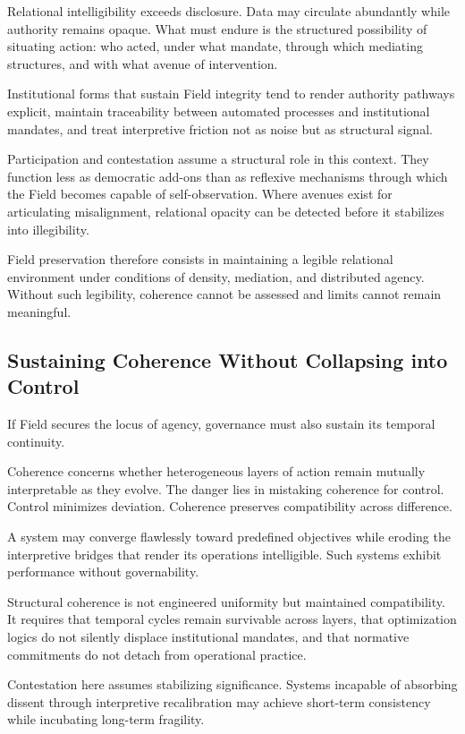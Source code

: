 \documentclass[12pt]{article}
\begin{document}
Relational intelligibility exceeds disclosure. Data may circulate abundantly while authority remains opaque. What must endure is the structured possibility of situating action: who acted, under what mandate, through which mediating structures, and with what avenue of intervention.

Institutional forms that sustain Field integrity tend to render authority pathways explicit, maintain traceability between automated processes and institutional mandates, and treat interpretive friction not as noise but as structural signal.

Participation and contestation assume a structural role in this context. They function less as democratic add-ons than as reflexive mechanisms through which the Field becomes capable of self-observation. Where avenues exist for articulating misalignment, relational opacity can be detected before it stabilizes into illegibility.

Field preservation therefore consists in maintaining a legible relational environment under conditions of density, mediation, and distributed agency. Without such legibility, coherence cannot be assessed and limits cannot remain meaningful.

\subsection{Sustaining Coherence Without Collapsing into Control}


If Field secures the locus of agency, governance must also sustain its temporal continuity.

Coherence concerns whether heterogeneous layers of action remain mutually interpretable as they evolve. The danger lies in mistaking coherence for control. Control minimizes deviation. Coherence preserves compatibility across difference.

A system may converge flawlessly toward predefined objectives while eroding the interpretive bridges that render its operations intelligible. Such systems exhibit performance without governability.

Structural coherence is not engineered uniformity but maintained compatibility. It requires that temporal cycles remain survivable across layers, that optimization logics do not silently displace institutional mandates, and that normative commitments do not detach from operational practice.

Contestation here assumes stabilizing significance. Systems incapable of absorbing dissent through interpretive recalibration may achieve short-term consistency while incubating long-term fragility.
\end{document}
